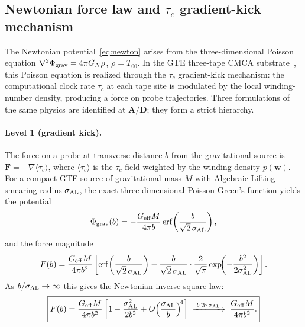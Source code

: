 \documentclass[11pt]{article}
\theoremstyle{remark}
\newcommand{\CatAD}{\textbf{A/D}}
\newcommand{\GN}{G_N}
\begin{document}
\subsection{Newtonian force law and \texorpdfstring{$\tau_c$}{tau\_c} gradient-kick mechanism}
\label{ssec:newtonian_limit}

The Newtonian potential~\eqref{eq:newton} arises from the three-dimensional Poisson equation
$\nabla^2\Phi_{\rm grav} = 4\pi\GN\rho$, $\rho = T_{00}$.
In the GTE three-tape CMCA substrate~\cite{SpivackCMCA}, this Poisson equation is realized
through the $\tau_c$ gradient-kick mechanism: the computational clock rate $\tau_c$ at each
tape site is modulated by the local winding-number density, producing a force on probe
trajectories.
Three formulations of the same physics are identified at $\CatAD$; they form a strict hierarchy.

\paragraph{Level 1 (gradient kick).}
The force on a probe at transverse distance $b$ from the gravitational source is
$\mathbf{F} = -\nabla\langle\tau_c\rangle$, where $\langle\tau_c\rangle$ is the
$\tau_c$ field weighted by the winding density $p(\mathbf{w})$.
For a compact GTE source of gravitational mass $M$ with Algebraic Lifting smearing radius
$\sigma_{\rm AL}$, the exact three-dimensional Poisson Green's function yields the potential
\begin{equation}
  \Phi_{\rm grav}(b) = -\frac{G_{\rm eff} M}{4\pi b}
  \,\mathrm{erf}\!\left(\frac{b}{\sqrt{2}\,\sigma_{\rm AL}}\right),
\label{eq:phi_gaussian}
\end{equation}
and the force magnitude
\begin{equation}
  F(b) = \frac{G_{\rm eff} M}{4\pi b^2}
  \left[\mathrm{erf}\!\left(\frac{b}{\sqrt{2}\,\sigma_{\rm AL}}\right)
  - \frac{b}{\sqrt{2}\,\sigma_{\rm AL}}\cdot\frac{2}{\sqrt{\pi}}
    \exp\!\!\left(-\frac{b^2}{2\sigma_{\rm AL}^2}\right)\right].
\label{eq:force_exact}
\end{equation}
As $b/\sigma_{\rm AL}\to\infty$ this gives the Newtonian inverse-square law:
\begin{equation}
  \boxed{F(b) = \frac{G_{\rm eff} M}{4\pi b^2}
  \left[1 - \frac{\sigma_{\rm AL}^2}{2b^2} + O\!\left(\frac{\sigma_{\rm AL}}{b}\right)^{\!4}\right]
  \;\xrightarrow{\;b\,\gg\,\sigma_{\rm AL}\;}\;
  \frac{G_{\rm eff} M}{4\pi b^2}.}
\label{eq:force_newton_limit}
\end{equation}
\end{document}
